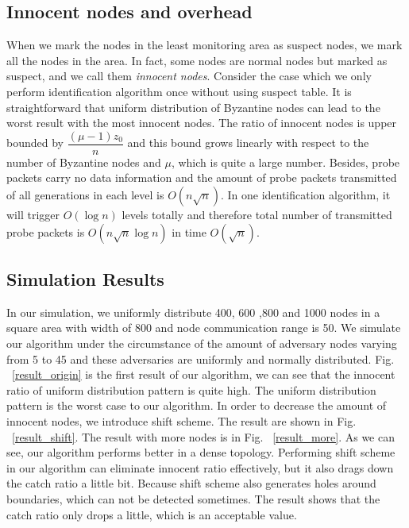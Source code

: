 \documentclass[conference]{IEEEtran}
\begin{document}
\subsection{Innocent nodes and overhead}
When we mark the nodes in the least monitoring area as suspect nodes, we mark all the nodes in the area. In fact, some nodes are normal nodes but marked as suspect, and we call them \emph{innocent nodes}.  Consider the case which we only perform identification algorithm once without using suspect table. It is straightforward that uniform distribution of Byzantine nodes can lead to the worst result with the most innocent nodes. The ratio of innocent nodes is upper bounded by $\dfrac{(\mu -1)z_0}{n}$ and this bound grows linearly with respect to the number of Byzantine nodes and $\mu$, which is quite a large number. Besides, probe packets carry no data information and the amount of probe packets transmitted of all generations in each level is $O(n\sqrt{n})$. In one identification algorithm, it will trigger $O(\log n)$ levels totally and therefore total number of transmitted probe packets is $O(n \sqrt{n}\log n)$ in time $O(\sqrt n)$.

\subsection{Simulation Results}
In our simulation, we uniformly distribute 400, 600 ,800 and 1000 nodes in a square area with width of 800 and node communication range is 50. We simulate our algorithm under the circumstance of the amount of adversary nodes varying from 5 to 45 and these adversaries are uniformly and normally distributed. Fig. ~\ref{result_origin} is the first result of our algorithm, we can see that the innocent ratio of uniform distribution pattern is quite high. The uniform distribution pattern is the worst case to our algorithm. In order to decrease the amount of innocent nodes, we introduce shift scheme. The result are shown in Fig. ~\ref{result_shift}. The result with more nodes is in Fig. ~\ref{result_more}. As we can see, our algorithm performs better in a dense topology. Performing shift scheme in our algorithm can eliminate innocent ratio effectively, but it also drags down the catch ratio a little bit. Because shift scheme also generates holes around boundaries, which can not be detected sometimes. The result shows that the catch ratio only drops a little, which is an acceptable value.
\end{document}
